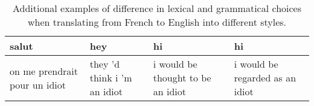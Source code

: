 \documentclass[11pt,a4paper]{article}
\begin{document}
\begin{table*}[]
\begin{tabular}{|p{3.5cm}|p{3.5cm}|p{3.5cm}|p{3.5cm}|}
salut                                                                                                                                             & hey                                                                                                                          & hi                                                                                                                                                  & hi                                                                                                                                                \\ \hline
on me prendrait pour un idiot                                                                                                                  & they 'd think i 'm an idiot                                                                                                & i would be thought to be an idiot                                                                                                                 & i would be regarded as an idiot                                                                                                                 \\ \hline
\end{tabular}
\caption{\small Additional examples of difference in lexical and grammatical choices when translating from French to English into different styles.
      }
\end{table*}
\end{document}
